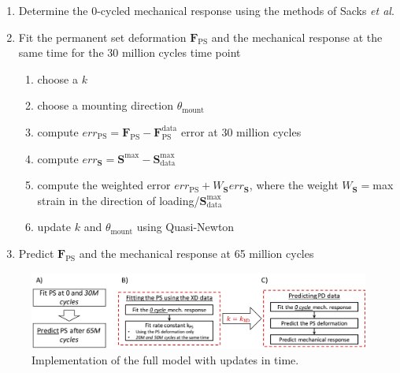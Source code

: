 \begin{enumerate}
\item Determine the 0-cycled mechanical response using the methods of Sacks \textit{et al}.\cite{sacks_novel_2016}
\item Fit the permanent set deformation $\mathbf{F}_\mathrm{PS}$ and the mechanical response at the same time for the 30 million cycles time point
	\begin{enumerate}
	\item choose a $k $
	\item choose a mounting direction $\theta_\mathrm{mount}$
	\item compute $err_\mathrm{PS} = \mathbf{F}_\mathrm{PS} - \mathbf{F}_\mathrm{PS}^\mathrm{data}$ error at 30 million cycles
	\item compute $err_\mathrm{\mathbf{S}} = \mathbf{S}^\mathrm{max} - \mathbf{S}_\mathrm{data}^\mathrm{max}$
	\item compute the weighted error $err_\mathrm{PS} + W_\mathbf{S} err_\mathbf{S}$, where the weight $W_\mathbf{S} = $max strain in the direction of loading/$\mathbf{S}_\mathrm{data}^\mathrm{max}$
	\item update $k $ and $\theta_\mathrm{mount}$ using Quasi-Newton
	\end{enumerate}
\item Predict $\mathbf{F}_\mathrm{PS}$ and the mechanical response at 65 million cycles
\end{enumerate}

\begin{figure}[hbt]
\centering
\includegraphics[width=0.55\paperwidth]{Images/chapter4/figure12}
\caption{Implementation of the full model with updates in time.}
\label{fig:implementation}
\end{figure}

